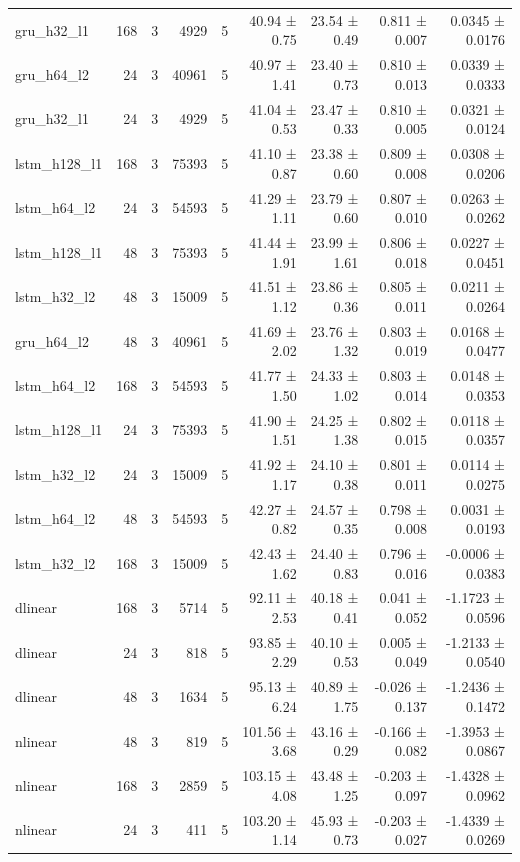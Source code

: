 \begin{table}[htbp]
\begin{tabular}{lrrrrrrrr}
gru\_h32\_l1 & 168 & 3 & 4929 & 5 & 40.94 ± 0.75 & 23.54 ± 0.49 & 0.811 ± 0.007 & 0.0345 ± 0.0176 \\
gru\_h64\_l2 & 24 & 3 & 40961 & 5 & 40.97 ± 1.41 & 23.40 ± 0.73 & 0.810 ± 0.013 & 0.0339 ± 0.0333 \\
gru\_h32\_l1 & 24 & 3 & 4929 & 5 & 41.04 ± 0.53 & 23.47 ± 0.33 & 0.810 ± 0.005 & 0.0321 ± 0.0124 \\
lstm\_h128\_l1 & 168 & 3 & 75393 & 5 & 41.10 ± 0.87 & 23.38 ± 0.60 & 0.809 ± 0.008 & 0.0308 ± 0.0206 \\
lstm\_h64\_l2 & 24 & 3 & 54593 & 5 & 41.29 ± 1.11 & 23.79 ± 0.60 & 0.807 ± 0.010 & 0.0263 ± 0.0262 \\
lstm\_h128\_l1 & 48 & 3 & 75393 & 5 & 41.44 ± 1.91 & 23.99 ± 1.61 & 0.806 ± 0.018 & 0.0227 ± 0.0451 \\
lstm\_h32\_l2 & 48 & 3 & 15009 & 5 & 41.51 ± 1.12 & 23.86 ± 0.36 & 0.805 ± 0.011 & 0.0211 ± 0.0264 \\
gru\_h64\_l2 & 48 & 3 & 40961 & 5 & 41.69 ± 2.02 & 23.76 ± 1.32 & 0.803 ± 0.019 & 0.0168 ± 0.0477 \\
lstm\_h64\_l2 & 168 & 3 & 54593 & 5 & 41.77 ± 1.50 & 24.33 ± 1.02 & 0.803 ± 0.014 & 0.0148 ± 0.0353 \\
lstm\_h128\_l1 & 24 & 3 & 75393 & 5 & 41.90 ± 1.51 & 24.25 ± 1.38 & 0.802 ± 0.015 & 0.0118 ± 0.0357 \\
lstm\_h32\_l2 & 24 & 3 & 15009 & 5 & 41.92 ± 1.17 & 24.10 ± 0.38 & 0.801 ± 0.011 & 0.0114 ± 0.0275 \\
lstm\_h64\_l2 & 48 & 3 & 54593 & 5 & 42.27 ± 0.82 & 24.57 ± 0.35 & 0.798 ± 0.008 & 0.0031 ± 0.0193 \\
lstm\_h32\_l2 & 168 & 3 & 15009 & 5 & 42.43 ± 1.62 & 24.40 ± 0.83 & 0.796 ± 0.016 & -0.0006 ± 0.0383 \\
dlinear & 168 & 3 & 5714 & 5 & 92.11 ± 2.53 & 40.18 ± 0.41 & 0.041 ± 0.052 & -1.1723 ± 0.0596 \\
dlinear & 24 & 3 & 818 & 5 & 93.85 ± 2.29 & 40.10 ± 0.53 & 0.005 ± 0.049 & -1.2133 ± 0.0540 \\
dlinear & 48 & 3 & 1634 & 5 & 95.13 ± 6.24 & 40.89 ± 1.75 & -0.026 ± 0.137 & -1.2436 ± 0.1472 \\
nlinear & 48 & 3 & 819 & 5 & 101.56 ± 3.68 & 43.16 ± 0.29 & -0.166 ± 0.082 & -1.3953 ± 0.0867 \\
nlinear & 168 & 3 & 2859 & 5 & 103.15 ± 4.08 & 43.48 ± 1.25 & -0.203 ± 0.097 & -1.4328 ± 0.0962 \\
nlinear & 24 & 3 & 411 & 5 & 103.20 ± 1.14 & 45.93 ± 0.73 & -0.203 ± 0.027 & -1.4339 ± 0.0269 \\

\end{tabular}
\end{table}
